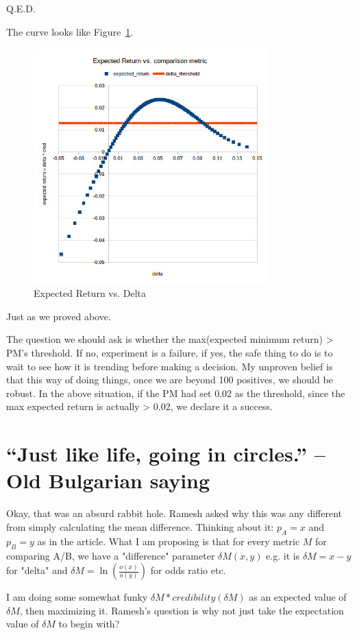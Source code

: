 \documentclass[letterpaper,12pt]{article}
\begin{document}
Q.E.D.

The curve looks like 
Figure~\ref{fig:exp_return_vs_delta}.
\begin{figure}[ht!]
\centering
\includegraphics[width=90mm]{expected_return_vs_delta}
\caption{Expected Return vs. Delta \label{fig:exp_return_vs_delta}}
\end{figure}
Just as we proved above.

The question we should ask is whether the max(expected minimum return) > PM's
threshold.  If no, experiment is a failure, if yes, the safe thing to
do is to wait to see how it is trending before making a decision.  My
unproven belief is that this way of doing things, once we are beyond
100 positives, we should be robust.  In the above situation, if the PM
had set 0.02 as the threshold, since the max expected return is
actually > 0.02, we declare it a success.

\section{``Just like life, going in circles.'' -- Old Bulgarian saying}
Okay, that was an absurd rabbit hole. Ramesh asked why this was any
different from simply calculating the mean difference. Thinking about
it: \(p_A = x\) and \(p_B = y\) as in the article.  What I am proposing is
that for every metric \(M\) for comparing A/B, we have a "difference"
parameter \(\delta M(x,y)\) e.g. it is \(\delta M= x-y\) for "delta" and \(\delta M= \ln\left(\frac{o(x)}{o(y)}\right)\) for
odds ratio etc.

I am doing some somewhat funky \(\delta M*credibility(\delta M)\) as an
expected value of \(\delta M\), then maximizing it. Ramesh's question is why
not just take the expectation value of \(\delta M\) to begin with?
\end{document}
